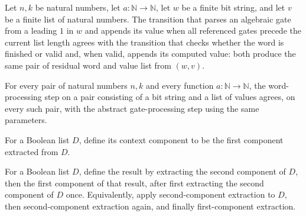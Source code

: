 \begin{theorem}
\label{Randomized.PIT.absStep_eq_wStep}
\leanok
{}
Let $n,k$ be natural numbers, let $a\colon\mathbb{N}\to\mathbb{N}$, let $w$ be a finite
bit string, and let $v$ be a finite list of natural numbers. The transition that parses
an algebraic gate from a leading $1$ in $w$ and appends its value when all referenced
gates precede the current list length agrees with the transition that checks whether the
word is finished or valid and, when valid, appends its computed value: both produce the
same pair of residual word and value list from $(w,v)$.
\end{theorem}

\begin{theorem}
\label{Randomized.PIT.wStep_eq_absStep}
\leanok
{}
For every pair of natural numbers $n,k$ and every function
$a\colon\mathbb{N}\to\mathbb{N}$, the word-processing step on a pair consisting of a bit
string and a list of values agrees, on every such pair, with the abstract
gate-processing step using the same parameters.
\end{theorem}

\begin{definition}
\label{Randomized.PIT.sCtx}
\leanok
{}
For a Boolean list $D$, define its context component to be the first component extracted
from $D$.
\end{definition}

\begin{definition}
\label{Randomized.PIT.sW}
\leanok
{}
For a Boolean list $D$, define the result by extracting the second component of $D$,
then the first component of that result, after first extracting the second component of
$D$ once. Equivalently, apply second-component extraction to $D$, then second-component
extraction again, and finally first-component extraction.
\end{definition}

